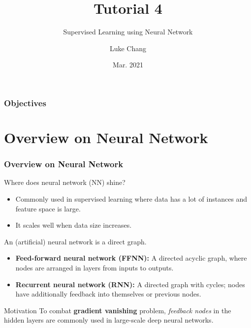 \documentclass[aspectratio=169, 10pt]{beamer}
\title{Tutorial 4}
\subtitle{Supervised Learning using Neural Network}
\author{Luke Chang}
\institute{The University of Auckland}
\date{Mar. 2021}
\begin{document}
\frame{\titlepage}

\begin{frame}
    \frametitle{Objectives}

    \tableofcontents
        
\end{frame}

\section{Overview on Neural Network}
\begin{frame}
    \frametitle{Overview on Neural Network}

    Where does neural network (NN) shine?
    \begin{itemize}
        \item Commonly used in supervised learning where data has a lot of instances and feature space is large.
        \item It scales well when data size increases.
    \end{itemize}
    
    An (artificial) neural network is a direct graph.
    \begin{itemize}
        \item \textbf{Feed-forward neural network (FFNN):} A directed acyclic graph, where nodes are arranged in layers from inputs to outputs.
        \item \textbf{Recurrent neural network (RNN):} A directed graph with cycles; nodes have additionally feedback into themselves or previous nodes.
    \end{itemize}

    \begin{block}{Motivation}
        To combat \textbf{gradient vanishing} problem, \textit{feedback nodes} in the hidden layers are commonly used in large-scale deep neural networks.
    \end{block}
        
\end{frame}
\end{document}
